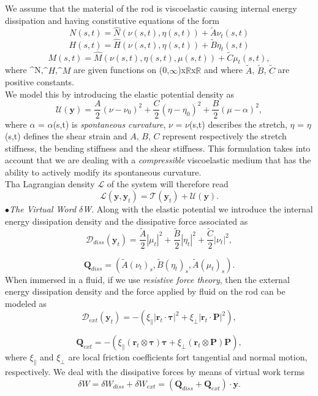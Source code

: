 \documentclass[12pt]{article}
\newcommand{\cB}{B}
\newcommand{\cA}{A}
\newcommand{\cC}{C}
\begin{document}
We assume that the material of the rod is viscoelastic causing internal energy dissipation and having constitutive equations of the form
\[  N (s,t)=  \hat{N}(\nu (s,t),\eta (s,t)) + \tilde{A} \nu_t (s,t)
\]
\[  H (s,t)=  \hat{H}(\nu (s,t),\eta (s,t)) + \tilde{B} \eta_t (s,t)
\]
\[  M (s,t)=  \hat{M}(\nu (s,t),\eta (s,t), \mu(s,t)) + \tilde{C} \mu_t (s,t),
\]
where \textasciicircum{N},$\^{H}$,$\^{M}$ are given functions on (0,$\infty$)x$\mathbb{R}$x$\mathbb{R}$ and where $\tilde{A}$, $\tilde{B}$, $\tilde{C}$ are positive constants.
\\
We model this by introducing the elastic potential density  as
\[ \mathcal{U}(\mathbf{y}) = \frac{\cA}{2} (\nu - \nu_0)^2
+ \frac{\cC}{2} (\eta - \eta_0 )^2
+ \frac{\cB}{2} (\mu -\alpha)^2,
\]
where $\alpha$ = $\alpha$(s,t) is \emph{spontaneous curvature}, $\nu$ = $\nu$(s,t) describes the stretch, $\eta$ = $\eta$(s,t) defines the shear strain and $\cA$, $\cB$, $\cC$ represent respectively the stretch stiffness, the bending stiffness and the shear stiffness. 
This formulation takes into account that we are dealing with a \emph{compressible} viscoelastic medium that has the ability to actively modify its spontaneous curvature.\\
Tha Lagrangian density $\mathcal{L}$ of the system will therefore read
\[ \mathcal{L}(\mathbf{y},\mathbf{y}_t)= \mathcal{T}(\mathbf{y}_t) + \mathcal{U}(\mathbf{y}).
\]
$\bullet$\emph{The Virtual Word $\delta$W}. Along with the elastic potential we introduce the internal energy dissipation density  and the dissipative force associated as 
\[ \mathcal{D}_{diss}(\mathbf{y}_t) = \frac{\tilde{A}}{2}\left|\mu_t\right|^2 + \frac{\tilde{B}}{2}\left|\eta_t\right|^2
+ \frac{\tilde{C}}{2}\left|\nu_t\right|^2,
\]

\[
\mathbf{Q}_{diss}= (\tilde{A}(\nu_t)_s,\tilde{B}(\eta_t)_s,\tilde{A}(\mu_t)_s).
\]
When immersed in a fluid, if we use \emph{resistive force theory},
then the external energy dissipation density and the force applied by fluid on the rod can be modeled as
\[ \mathcal{D}_{ext}(\mathbf{y}_t)= -(\xi_\parallel\left|\mathbf{r}_t\cdot\mathbf{\tau}\right|^2 + \xi_\perp \left|\mathbf{r}_t\cdot\mathbf{P}\right|^2),
\]

\[\mathbf{Q}_{ext} = -( \xi_\parallel (\mathbf{r}_t\otimes\mathbf{\tau})\mathbf{\tau} + \xi_\perp (\mathbf{r}_t\otimes\mathbf{P})\mathbf{P}),
\]
where $\xi_\parallel$ and $\xi_\perp$ are local friction coefficients fort tangential and normal motion, respectively.
We deal with the dissipative forces by means of virtual work terms
\[\delta W = \delta W_{diss} + \delta W_{ext} = (\mathbf{Q}_{diss}+\mathbf{Q}_{ext})\cdot\mathbf{y}.\]
\end{document}
